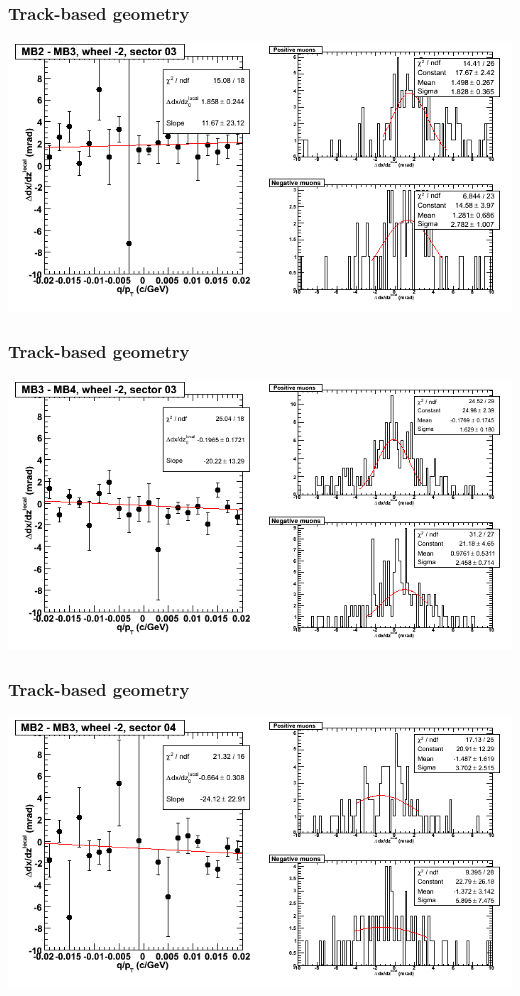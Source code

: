 \documentclass[compress]{beamer}
\begin{document}
\begin{frame}
\frametitle{Track-based geometry}
\includegraphics[width=\linewidth]{NOV4_segdiffs/dt13_slope_A_03_23.png}
\end{frame}

\begin{frame}
\frametitle{Track-based geometry}
\includegraphics[width=\linewidth]{NOV4_segdiffs/dt13_slope_A_03_34.png}
\end{frame}

\begin{frame}
\frametitle{Track-based geometry}
\includegraphics[width=\linewidth]{NOV4_segdiffs/dt13_slope_A_04_23.png}
\end{frame}
\end{document}
